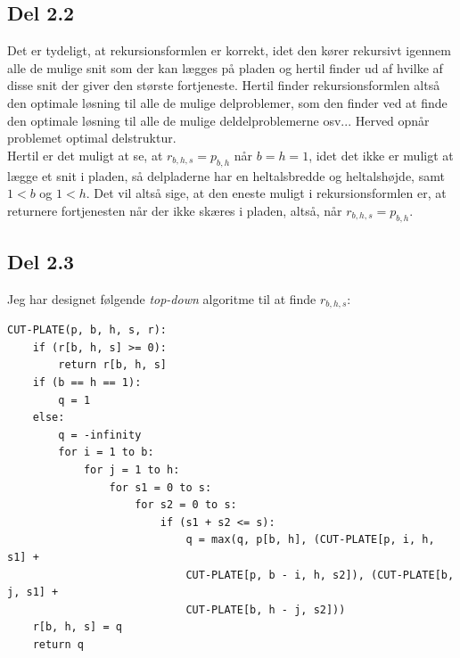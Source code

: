 \documentclass{report}
\begin{document}
\newpage

\subsection*{Del 2.2}
Det er tydeligt, at rekursionsformlen er korrekt, idet den kører rekursivt igennem alle de mulige snit som der kan lægges på pladen og hertil finder ud af hvilke af disse snit der giver den største fortjeneste. Hertil finder rekursionsformlen altså den optimale løsning til alle de mulige delproblemer, som den finder ved at finde den optimale løsning til alle de mulige deldelproblemerne osv... Herved opnår problemet optimal delstruktur. \\
Hertil er det muligt at se, at $r_{b, h, s} = p_{b, h}$ når $b = h = 1$, idet det ikke er muligt at lægge et snit i pladen, så delpladerne har en heltalsbredde og heltalshøjde, samt $1 < b$ og $1 < h$. Det vil altså sige, at den eneste muligt i rekursionsformlen er, at returnere fortjenesten når der ikke skæres i pladen, altså, når $r_{b, h, s} = p_{b, h}$.

\newpage

\subsection*{Del 2.3}
Jeg har designet følgende \textit{top-down} algoritme til at finde $r_{b, h, s}$:
\begin{verbatim}
CUT-PLATE(p, b, h, s, r):
    if (r[b, h, s] >= 0):
        return r[b, h, s]
    if (b == h == 1):
        q = 1
    else:
        q = -infinity
        for i = 1 to b:
            for j = 1 to h:
                for s1 = 0 to s:
                    for s2 = 0 to s:
                        if (s1 + s2 <= s):
                            q = max(q, p[b, h], (CUT-PLATE[p, i, h, s1] + 
                            CUT-PLATE[p, b - i, h, s2]), (CUT-PLATE[b, j, s1] +
                            CUT-PLATE[b, h - j, s2]))
    r[b, h, s] = q
    return q
\end{verbatim}
\end{document}

